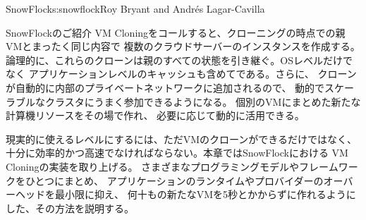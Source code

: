 \begin{aosachapter}{SnowFlock}{s:snowflock}{Roy Bryant and Andr\'e{s} Lagar-Cavilla}
\begin{aosasect1}{SnowFlockのご紹介}
VM Cloningをコールすると、クローニングの時点での親VMとまったく同じ内容で
複数のクラウドサーバーのインスタンスを作成する。
論理的に、これらのクローンは親のすべての状態を引き継ぐ。OSレベルだけでなく
アプリケーションレベルのキャッシュも含めてである。さらに、
クローンが自動的に内部のプライベートネットワークに追加されるので、
動的でスケーラブルなクラスタにうまく参加できるようになる。
個別のVMにまとめた新たな計算機リソースをその場で作れ、
必要に応じて動的に活用できる。

現実的に使えるレベルにするには、ただVMのクローンができるだけではなく、
十分に効率的かつ高速でなければならない。本章ではSnowFlockにおける
VM Cloningの実装を取り上げる。
さまざまなプログラミングモデルやフレームワークをひとつにまとめ、
アプリケーションのランタイムやプロバイダーのオーバーヘッドを最小限に抑え、
何十もの新たなVMを5秒とかからずに作れるようにした、その方法を説明する。


\end{aosasect1}
\end{aosachapter}
